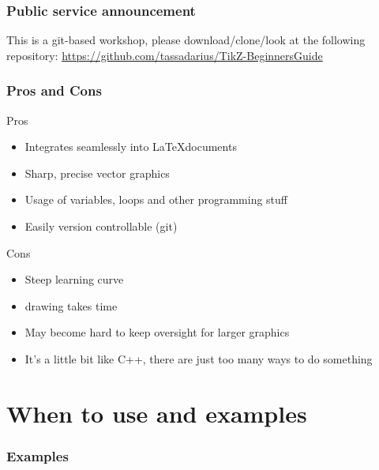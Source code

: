 \documentclass{beamer}
\begin{document}

\begin{frame}
\frametitle{Public service announcement}

    This is a git-based workshop, please download/clone/look at the following repository:
    \footnotesize \url{https://github.com/tassadarius/TikZ-BeginnersGuide}

\end{frame}


\begin{frame}
\frametitle{Pros and Cons}
Pros
\begin{itemize}
\item Integrates seamlessly into \LaTeX documents
\item Sharp, precise vector graphics
\item Usage of variables, loops and other programming stuff
\item Easily version controllable (git)
\end{itemize}
\vspace{1em}
Cons
\begin{itemize}
    \item Steep learning curve
    \item drawing takes time
    \item May become hard to keep oversight for larger graphics
    \item It's a little bit like C++, there are just too many ways to do something
\end{itemize}
\end{frame}


\section{When to use and examples}

\begin{frame}
    \frametitle{Examples}
       \begin{minipage}{0.25\textwidth}
        
       \end{minipage}
       \begin{minipage}{0.7\textwidth}
         
         \vspace{-5em}
         \begin{figure}
            \centering
         
         \end{figure}
       \end{minipage}
\end{frame}
\end{document}
